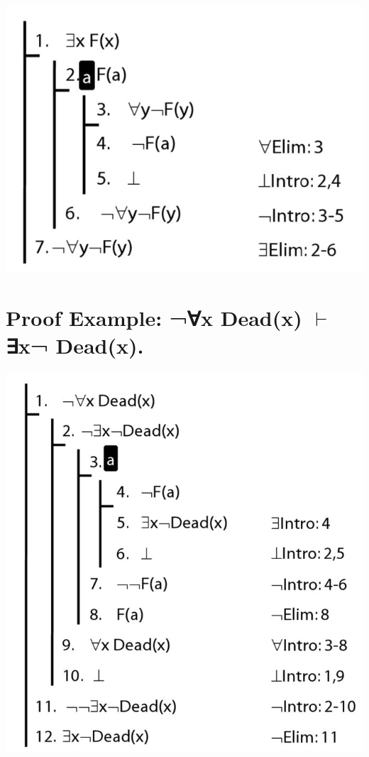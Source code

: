 \documentclass[12pt]{extarticle}
\begin{document}
\begin{multicols*}{3}
\begin{center}
\includegraphics[scale=0.3]{img/unit_825_proof.png}
\end{center}
 
 
\section{Proof Example: ¬∀x Dead(x) $\vdash$ ∃x¬ Dead(x).}
 
\begin{center}
\includegraphics[scale=0.3]{img/unit_826_proof.png}
\end{center}

\end{multicols*}
\end{document}
